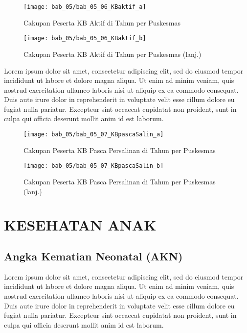 \begin{figure}[H]
    \centering
    \texttt{[image: bab\_05/bab\_05\_06\_KBaktif\_a]}
    \caption{Cakupan Peserta KB Aktif di \namaKabupaten Tahun \tP per Puskesmas}
    \label{fig:Cakupan-KB-aktif-a}
\end{figure}

\begin{figure}[H]
    \centering
    \texttt{[image: bab\_05/bab\_05\_06\_KBaktif\_b]}
    \caption{Cakupan Peserta KB Aktif di \namaKabupaten Tahun \tP per Puskesmas (lanj.)}
    \label{fig:Cakupan-KB-aktif-b}
\end{figure}

Lorem ipsum dolor sit amet, consectetur adipiscing elit, sed do eiusmod tempor incididunt ut labore et dolore magna aliqua. Ut enim ad minim veniam, quis nostrud exercitation ullamco laboris nisi ut aliquip ex ea commodo consequat. Duis aute irure dolor in reprehenderit in voluptate velit esse cillum dolore eu fugiat nulla pariatur. Excepteur sint occaecat cupidatat non proident, sunt in culpa qui officia deserunt mollit anim id est laborum.

\begin{figure}[H]
    \centering
    \texttt{[image: bab\_05/bab\_05\_07\_KBpascaSalin\_a]}
    \caption{Cakupan Peserta KB Pasca Persalinan di \namaKabupaten Tahun \tP per Puskesmas}
    \label{fig:Cakupan-KB-pascaSalin-a}
\end{figure}

\begin{figure}[H]
    \centering
    \texttt{[image: bab\_05/bab\_05\_07\_KBpascaSalin\_b]}
    \caption{Cakupan Peserta KB Pasca Persalinan di \namaKabupaten Tahun \tP per Puskesmas (lanj.)}
    \label{fig:Cakupan-KB-pascaSalin-b}
\end{figure}

\section{KESEHATAN ANAK}
\subsection{Angka Kematian Neonatal (AKN)}
Lorem ipsum dolor sit amet, consectetur adipiscing elit, sed do eiusmod tempor incididunt ut labore et dolore magna aliqua. Ut enim ad minim veniam, quis nostrud exercitation ullamco laboris nisi ut aliquip ex ea commodo consequat. Duis aute irure dolor in reprehenderit in voluptate velit esse cillum dolore eu fugiat nulla pariatur. Excepteur sint occaecat cupidatat non proident, sunt in culpa qui officia deserunt mollit anim id est laborum.

